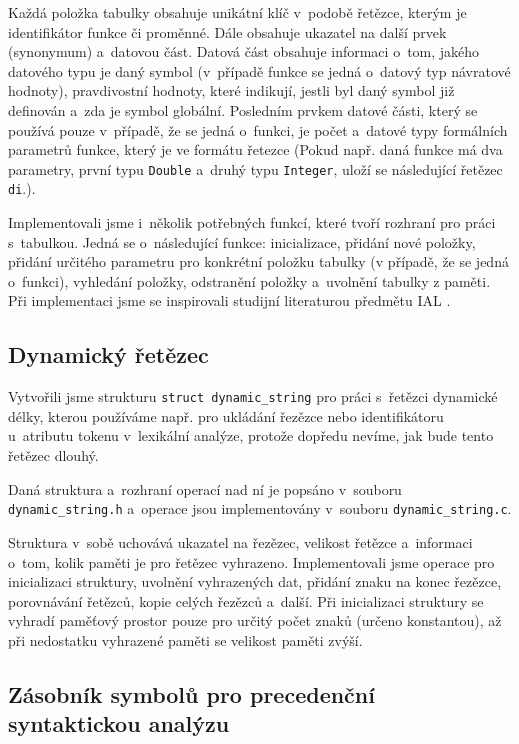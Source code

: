 \documentclass[a4paper, 11pt]{article}
\begin{document}
	Každá položka tabulky obsahuje unikátní klíč v~podobě řetězce, kterým je identifikátor funkce
	či proměnné. Dále obsahuje ukazatel na další prvek (synonymum) a~datovou část. Datová část obsahuje
	informaci o~tom, jakého datového typu je daný symbol (v~případě funkce se jedná o~datový typ
	návratové hodnoty), pravdivostní hodnoty, které indikují, jestli byl daný symbol již definován
	a~zda je symbol globální. Posledním prvkem datové části, který se používá pouze v~případě, že se
	jedná o~funkci, je počet a~datové typy formálních parametrů funkce, který je ve formátu řetezce
	(Pokud např. daná funkce má dva parametry, první typu \texttt{Double} a~druhý typu \texttt{Integer},
	uloží se následující řetězec \texttt{di}.).

	Implementovali jsme i~několik potřebných funkcí, které tvoří rozhraní pro práci s~tabulkou.
	Jedná se o~následující funkce: inicializace, přidání nové položky, přidání určitého parametru
	pro konkrétní položku tabulky (v případě, že se jedná o~funkci), vyhledání položky, odstranění
	položky a~uvolnění tabulky z paměti. Při implementaci jsme se inspirovali studijní literaturou
	předmětu IAL \cite{Honzik1991}.


	\subsection{Dynamický řetězec}

	Vytvořili jsme strukturu \texttt{struct dynamic\_string} pro práci s~řetězci dynamické délky, kterou používáme
	např. pro ukládání řezězce nebo identifikátoru u~atributu tokenu v~lexikální analýze, protože dopředu nevíme,
	jak bude tento řetězec dlouhý.

	Daná struktura a~rozhraní operací nad ní je popsáno v~souboru \texttt{dynamic\_string.h} a~operace jsou implementovány
	v~souboru \texttt{dynamic\_string.c}.

	Struktura v~sobě uchovává ukazatel na řezězec, velikost řetězce a~informaci o~tom, kolik paměti je pro
	řetězec vyhrazeno. Implementovali jsme operace pro inicializaci struktury, uvolnění vyhrazených dat,
	přidání znaku na konec řezězce, porovnávání řetězců, kopie celých řezězců a~další. Při inicializaci struktury
	se vyhradí paměťový prostor pouze pro určitý počet znaků (určeno konstantou), až při nedostatku vyhrazené
	paměti se velikost paměti zvýší.


	\subsection{Zásobník symbolů pro precedenční syntaktickou analýzu}
\end{document}
